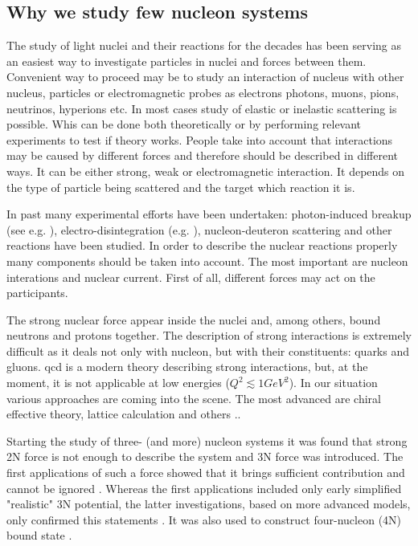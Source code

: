 \subsection*{Why we study few nucleon systems}

The study of light nuclei and their reactions for the decades has been serving as an easiest way
to investigate particles in nuclei and forces between them. 
Convenient way to proceed may be to study an interaction of nucleus with
other nucleus, particles or electromagnetic probes
as electrons photons, muons, pions, neutrinos, hyperions etc. In most cases study of
 elastic or inelastic scattering is possible.
Whis can be done both theoretically or by 
performing relevant experiments to test if theory works.
People take into account that interactions may be caused by different forces
and therefore should be described in different ways. It can be
either strong, weak or electromagnetic interaction. It depends
on the type of particle being scattered and the target which reaction it is.

In past many experimental efforts have been undertaken:
  photon-induced breakup (see e.g. \cite{Skopik1974, rachek2007}),
electro-disintegration (e.g. \cite{LAGET200549}), nucleon-deuteron scattering and other reactions
have been studied. 
In order to describe the nuclear reactions properly many
components should be taken into account.
The most important are nucleon interations and nuclear current.
First of all, different forces may act on
the participants.


The strong nuclear force appear inside the nuclei and, among others, bound neutrons 
and protons together. The description of strong interactions is extremely
difficult as it deals not only with nucleon, but with their constituents: quarks
and gluons. \gls{qcd} is a modern theory
describing strong interactions, but, at the moment,
it is not applicable at low energies ($Q^2 \lesssim 1 GeV^2$).
In our situation various approaches are coming into the scene.
The most advanced are 
chiral effective theory, lattice calculation and others \cite{IOFFE2006232, BEANElaticce, Machleidt2011}..

Starting the study of three- (and more) nucleon systems it was found that 
strong 2N force is not enough to describe
the system and 3N force was introduced. The first applications of such
a force showed that it brings sufficient contribution and cannot be ignored \cite{GLOCKLE1982343}.
Whereas the first applications included only early simplified "realistic" 3N potential, the latter
investigations, based on more advanced models, only confirmed this statements \cite{StoksPhysRevC49, WIRINGAPhysRevC51}.
It was also used to construct four-nucleon (4N) bound state \cite{NoggaPhysRevLett}.

